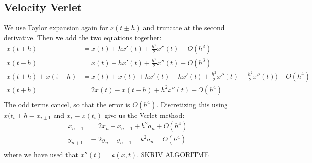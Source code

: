 \documentclass{article}
\begin{document}
\subsection*{Velocity Verlet}
We use Taylor expansion again for $x(t\pm h)$ and truncate at the second derivative. Then we add the two equations together:
\begin{align*}
  x(t+h) &= x(t)+hx'(t)+\frac{h^2}{2}x''(t)+O(h^3)\\
  x(t-h) &= x(t)-hx'(t)+\frac{h^2}{2}x''(t)+O(h^3)\\
  x(t+h)+x(t-h) &= x(t)+x(t)+hx'(t)-hx'(t)+\frac{h^2}{2}x''(t)+\frac{h^2}{2}x''(t))+O(h^4)\\
  x(t+h) &= 2x(t)-x(t-h)+h^2x''(t)+O(h^4)\\
\end{align*}
The odd terms cancel, so that the error is $O(h^4)$.
Discretizing this using $x(t_i\pm h = x_{i\pm 1}$ and $x_i = x(t_i)$ give us the Verlet method: 
\begin{align*}
  x_{n+1} &= 2x_n-x_{n-1}+h^2a_n+O(h^4)\\
  y_{n+1} &= 2y_n-y_{n-1}+h^2a_n+O(h^4)\\
\end{align*}
where we have used that $x''(t) = a(x,t)$.
SKRIV ALGORITME
\newpage
\end{document}
